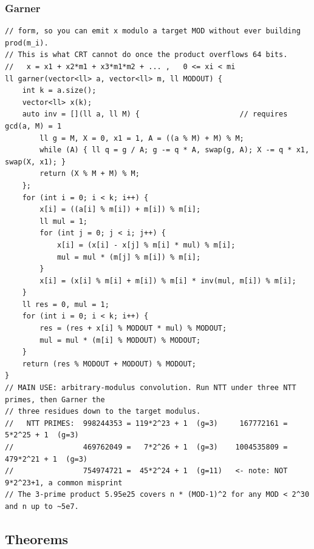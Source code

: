 \documentclass[9pt,a4paper,twocolumn]{extarticle}
\begin{document}
\filbreak
\subsubsection{Garner}
\nopagebreak
\begin{lstlisting}
// form, so you can emit x modulo a target MOD without ever building prod(m_i).
// This is what CRT cannot do once the product overflows 64 bits.
//   x = x1 + x2*m1 + x3*m1*m2 + ... ,   0 <= xi < mi
ll garner(vector<ll> a, vector<ll> m, ll MODOUT) {
    int k = a.size();
    vector<ll> x(k);
    auto inv = [](ll a, ll M) {                       // requires gcd(a, M) = 1
        ll g = M, X = 0, x1 = 1, A = ((a % M) + M) % M;
        while (A) { ll q = g / A; g -= q * A, swap(g, A); X -= q * x1, swap(X, x1); }
        return (X % M + M) % M;
    };
    for (int i = 0; i < k; i++) {
        x[i] = ((a[i] % m[i]) + m[i]) % m[i];
        ll mul = 1;
        for (int j = 0; j < i; j++) {
            x[i] = (x[i] - x[j] % m[i] * mul) % m[i];
            mul = mul * (m[j] % m[i]) % m[i];
        }
        x[i] = (x[i] % m[i] + m[i]) % m[i] * inv(mul, m[i]) % m[i];
    }
    ll res = 0, mul = 1;
    for (int i = 0; i < k; i++) {
        res = (res + x[i] % MODOUT * mul) % MODOUT;
        mul = mul * (m[i] % MODOUT) % MODOUT;
    }
    return (res % MODOUT + MODOUT) % MODOUT;
}
// MAIN USE: arbitrary-modulus convolution. Run NTT under three NTT primes, then Garner the
// three residues down to the target modulus.
//   NTT PRIMES:  998244353 = 119*2^23 + 1  (g=3)     167772161 =   5*2^25 + 1  (g=3)
//                469762049 =   7*2^26 + 1  (g=3)    1004535809 = 479*2^21 + 1  (g=3)
//                754974721 =  45*2^24 + 1  (g=11)   <- note: NOT 9*2^23+1, a common misprint
// The 3-prime product 5.95e25 covers n * (MOD-1)^2 for any MOD < 2^30 and n up to ~5e7.
\end{lstlisting}

\subsection{Theorems}

\filbreak
\end{document}
